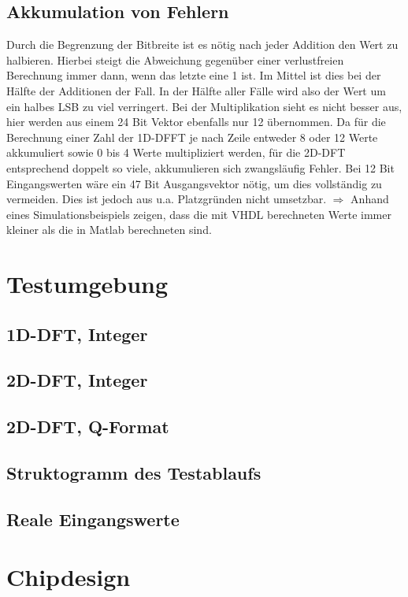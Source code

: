  \subsection{Akkumulation von Fehlern}
 Durch die Begrenzung der Bitbreite ist es nötig nach jeder Addition den Wert zu halbieren. Hierbei steigt die Abweichung gegenüber einer verlustfreien Berechnung immer dann, 
 wenn das letzte eine 1 ist. Im Mittel ist dies bei der Hälfte der Additionen der Fall. In der Hälfte aller Fälle wird also der Wert um ein halbes LSB zu viel verringert.
 Bei der Multiplikation sieht es nicht besser aus, hier werden aus einem 24 Bit Vektor ebenfalls nur 12 übernommen.
 Da für die Berechnung einer Zahl der 1D-DFFT je nach Zeile entweder 8 oder 12 Werte akkumuliert sowie 0 bis 4 Werte multipliziert werden, für die 2D-DFT entsprechend doppelt 
 so viele, akkumulieren sich zwangsläufig Fehler. Bei 12 Bit Eingangswerten wäre ein 47 Bit Ausgangsvektor nötig, um dies vollständig zu vermeiden. Dies ist jedoch aus u.a.
 Platzgründen nicht umsetzbar.
 $\Rightarrow$ Anhand eines Simulationsbeispiels zeigen, dass die mit VHDL berechneten Werte immer kleiner als die in Matlab berechneten sind.

 \section{Testumgebung}
 \subsection{1D-DFT, Integer}
 \subsection{2D-DFT, Integer}
 \subsection{2D-DFT, Q-Format}
 \subsection{Struktogramm des Testablaufs}
 \subsection{Reale Eingangswerte}
 
 \section{Chipdesign}
